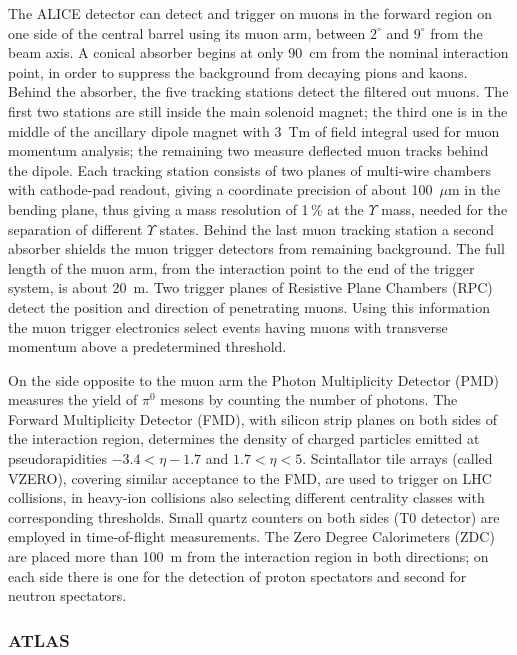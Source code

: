 The ALICE detector can detect and trigger on muons in the forward region on one side of the central barrel using its muon arm, between $2^\circ$ and $9^\circ$ from the beam axis. A conical absorber begins at only 90~cm from the nominal interaction point, in order to suppress the background from decaying pions and kaons. Behind the absorber, the five tracking stations detect the filtered out muons. The first two stations are still inside the main solenoid magnet; the third one is in the middle of the ancillary dipole magnet with 3~Tm of field integral used for muon momentum analysis; the remaining two measure deflected muon tracks behind the dipole. Each tracking station consists of two planes of multi-wire chambers with cathode-pad readout, giving a coordinate precision of about 100~$\mu$m in the bending plane, thus giving a mass resolution of 1\,\% at the $\Upsilon$ mass, needed for the separation of different $\Upsilon$ states. Behind the last muon tracking station a second absorber shields the muon trigger detectors from remaining background. The full length of the muon arm, from the interaction point to the end of the trigger system, is about 20~m. Two trigger planes of Resistive Plane Chambers (RPC) detect the position and direction of penetrating muons. Using this information the muon trigger electronics select events having muons with transverse momentum above a predetermined threshold.

On the side opposite to the muon arm the Photon Multiplicity Detector (PMD) measures the yield of $\pi^0$ mesons by counting the number of photons. The Forward Multiplicity Detector (FMD), with silicon strip planes on both sides of the interaction region, determines the density of charged particles emitted at pseudorapidities $-3.4 < \eta -1.7$ and $1.7 < \eta < 5$. Scintallator tile arrays (called VZERO), covering similar acceptance to the FMD, are used to trigger on LHC collisions, in heavy-ion collisions also selecting different centrality classes with corresponding thresholds. Small quartz counters on both sides (T0 detector) are employed in time-of-flight measurements. The Zero Degree Calorimeters (ZDC) are placed more than 100~m from the interaction region in both directions; on each side there is one for the detection of proton spectators and second for neutron spectators.



\subsubsection{ATLAS}

